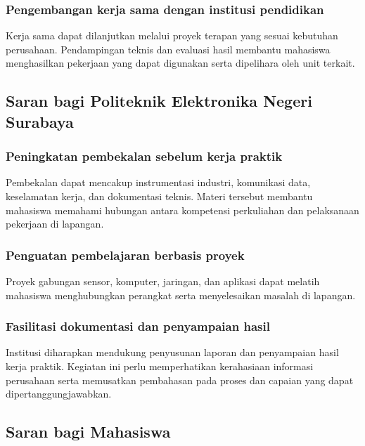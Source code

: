 \subsubsection{Pengembangan kerja sama dengan institusi pendidikan}

Kerja sama dapat dilanjutkan melalui proyek terapan yang sesuai kebutuhan perusahaan. Pendampingan teknis dan evaluasi hasil membantu mahasiswa menghasilkan pekerjaan yang dapat digunakan serta dipelihara oleh unit terkait.

\subsection{Saran bagi Politeknik Elektronika Negeri Surabaya}

\subsubsection{Peningkatan pembekalan sebelum kerja praktik}

Pembekalan dapat mencakup instrumentasi industri, komunikasi data, keselamatan kerja, dan dokumentasi teknis. Materi tersebut membantu mahasiswa memahami hubungan antara kompetensi perkuliahan dan pelaksanaan pekerjaan di lapangan.

\subsubsection{Penguatan pembelajaran berbasis proyek}

Proyek gabungan sensor, komputer, jaringan, dan aplikasi dapat melatih mahasiswa menghubungkan perangkat serta menyelesaikan masalah di lapangan.

\subsubsection{Fasilitasi dokumentasi dan penyampaian hasil}

Institusi diharapkan mendukung penyusunan laporan dan penyampaian hasil kerja praktik. Kegiatan ini perlu memperhatikan kerahasiaan informasi perusahaan serta memusatkan pembahasan pada proses dan capaian yang dapat dipertanggungjawabkan.

\subsection{Saran bagi Mahasiswa}

